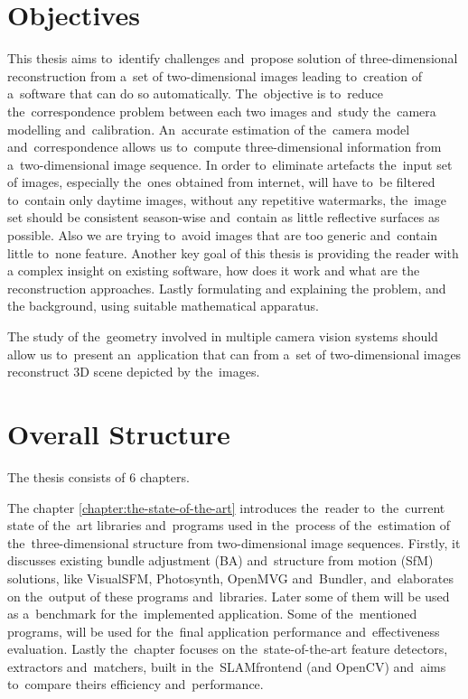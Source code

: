 \section{Objectives}
This thesis aims to~identify challenges and~propose solution of three-dimensional reconstruction from a~set of two-dimensional images leading to~creation of a~software that can do so automatically. The~objective is to~reduce the~correspondence problem between each two images and~study the~camera modelling and~calibration. An~accurate estimation of the~camera model and~correspondence allows us to~compute three-dimensional information from a~two-dimensional image sequence. In order to~eliminate artefacts the~input set of images, especially the~ones obtained from internet, will have to~be filtered to~contain only daytime images, without any repetitive watermarks, the~image set should be consistent season-wise and~contain as little reflective surfaces as possible. Also we are trying to~avoid images that are too generic and~contain little to~none feature. Another key goal of this thesis is providing the reader with a complex insight on existing software, how does it work and what are the reconstruction approaches. Lastly formulating and explaining the problem, and the background, using suitable mathematical apparatus.

The study of the~geometry involved in multiple camera vision systems should allow us to~present an~application that can from a~set of two-dimensional images reconstruct 3D scene depicted by the~images.

\section{Overall Structure}
The thesis consists of 6 chapters.

The chapter \ref{chapter:the-state-of-the-art} introduces the~reader to~the~current state of the~art libraries and~programs used in the~process of the~estimation of the~three-dimensional structure from two-dimensional image sequences. Firstly, it discusses existing bundle adjustment (BA) and~structure from motion (SfM) solutions, like VisualSFM, Photosynth, OpenMVG and~Bundler, and~elaborates on the~output of these programs and~libraries. Later some of them will be used as a~benchmark for the~implemented application. Some of the~mentioned programs, will be used for the~final application performance and~effectiveness evaluation. Lastly the~chapter focuses on the~state-of-the-art feature detectors, extractors and~matchers, built in the~SLAM\textunderscore frontend (and OpenCV) and~aims to~compare theirs efficiency and~performance.


